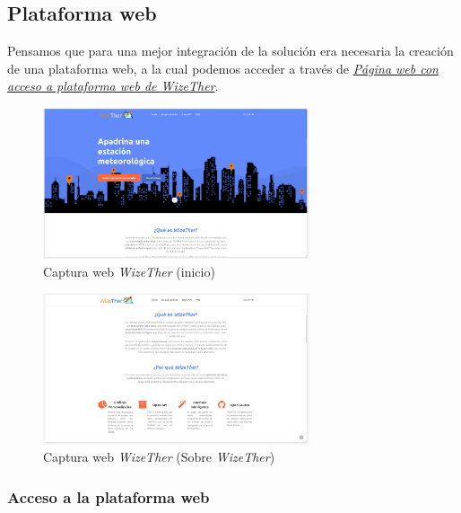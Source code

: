 \documentclass[12pt]{article}
\begin{document}
\pagebreak

\subsection{Plataforma web}
Pensamos que para una mejor integración de la solución era necesaria la creación de una plataforma web, a la cual podemos acceder a través de \href{https://wizether.ranii.pro/}{\textit{Página web con acceso a plataforma web de \textit{WizeTher}}}. \\

\begin{figure}[h]
	\begin{center}
		\includegraphics[width=0.7\textwidth]{img_rani/web_home.png}
		\caption{Captura web \textit{WizeTher} (inicio)}
	\end{center}
\end{figure}

\begin{figure}[h]
	\begin{center}
		\includegraphics[width=0.7\textwidth]{img_rani/web_wizether.png}
		\caption{Captura web \textit{WizeTher} (Sobre \textit{WizeTher})}
	\end{center}
\end{figure}

\pagebreak

\subsubsection{Acceso a la plataforma web}
\end{document}
